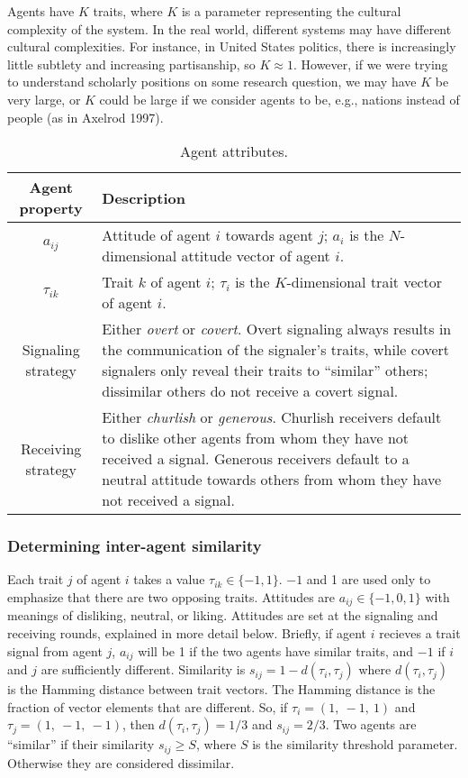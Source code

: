 \documentclass[11pt,letterpaper]{article}
\begin{document}
Agents have $K$ traits, where $K$ is a parameter representing the cultural 
complexity of the system. In the real world, different systems may have 
different cultural complexities. For instance, in United States politics, there
is increasingly little subtlety and increasing partisanship, so $K \approx1 $.
However, if we were trying to understand scholarly positions on some research
question, we may have $K$ be very large, or $K$ could be large if we consider
agents to be, e.g., nations instead of people (as in Axelrod 1997).  

\begin{table}[H]
  \centering
  \begin{tabular}{cp{4.5in}}
    Agent property & Description \\
    \toprule
    $a_{ij}$   & Attitude of agent $i$ towards agent $j$; $a_i$ is the $N$-dimensional 
      attitude vector of agent $i$. \\
    $\tau_{ik}$ & Trait $k$ of agent $i$; $\tau_i$ is the $K$-dimensional trait vector of agent $i$. \\
    Signaling strategy & Either \emph{overt} or \emph{covert}. Overt signaling always
                         results in the communication of the signaler's traits,
                         while covert signalers only reveal their traits to 
                         ``similar'' others; dissimilar others do not receive a covert signal. \\
    Receiving strategy & Either \emph{churlish} or \emph{generous}. Churlish
                         receivers default to dislike other agents from whom they have
                         not received a signal. Generous receivers default to
                         a neutral attitude towards others from whom they have
                         not received a signal.
  \end{tabular}
  \caption{Agent attributes.}
  \label{tab:agentAttributes}
\end{table}


\subsubsection{Determining inter-agent similarity}

Each trait $j$ of agent $i$ takes a value $\tau_{ik} \in \{-1, 1\}$. $-1$ and 1
are used only to emphasize that there are two opposing traits.
Attitudes are $a_{ij} \in \{-1, 0, 1\}$ with meanings of 
disliking, neutral, or liking. Attitudes are set at the signaling and receiving
rounds, explained in more detail below. Briefly, if agent $i$ recieves a
trait signal from agent $j$, $a_{ij}$ will be 1 if the two agents have
similar traits, and $-1$ if $i$ and $j$ are sufficiently different. Similarity
is $s_{ij} = 1 - d(\tau_i, \tau_j)$ where $d(\tau_i, \tau_j)$ is the
Hamming distance between trait vectors. The Hamming distance is the fraction
of vector elements that are different. So, if $\tau_i = (1,~-1,~1)$ and
$\tau_j = (1,~-1,~-1)$, then $d(\tau_i, \tau_j) = 1/3$ and $s_{ij}=2/3$.
Two agents are ``similar'' if their similarity $s_{ij} \geq S$, where
$S$ is the similarity threshold parameter. Otherwise they are considered
dissimilar. 
\end{document}
